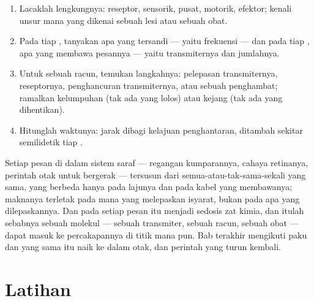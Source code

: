 \begin{method}\label{met:g12:stretch-reflex:analyse}
\begin{enumerate}
  \item Lacaklah lengkungnya: reseptor,  sensorik, pusat, 
        motorik, efektor; kenali unsur mana yang dikenai sebuah lesi
        atau sebuah obat.
  \item Pada tiap , tanyakan apa yang tersandi --- yaitu
        frekuensi  --- dan pada tiap , apa
        yang membawa pesannya --- yaitu transmiternya dan jumlahnya.
  \item Untuk sebuah racun, temukan langkahnya: pelepasan transmiternya,
        reseptornya, penghancuran transmiternya, atau sebuah 
        penghambat; ramalkan kelumpuhan (tak ada yang lolos) atau
        kejang (tak ada yang dihentikan).
  \item Hitunglah waktunya: jarak dibagi kelajuan penghantaran, ditambah
        sekitar semilidetik tiap .
\end{enumerate}
\end{method}

\begin{remark}\label{rem:g12:stretch-reflex:spikes}
Setiap pesan di dalam sistem saraf --- regangan kumparannya, cahaya
retinanya, perintah otak untuk bergerak --- tersusun dari  semua-atau-tak-sama-sekali yang sama, yang berbeda hanya pada
lajunya dan pada kabel yang membawanya; maknanya terletak pada 
mana yang melepaskan isyarat, bukan pada apa yang dilepaskannya. Dan
pada setiap  pesan itu menjadi sedosis zat kimia, dan itulah
sebabnya sebuah molekul --- sebuah transmiter, sebuah racun, sebuah
obat --- dapat masuk ke percakapannya di titik mana pun. Bab terakhir
mengikuti paku dan  yang sama itu naik ke dalam otak, dan
perintah yang turun kembali.
\end{remark}

\section{Latihan}

